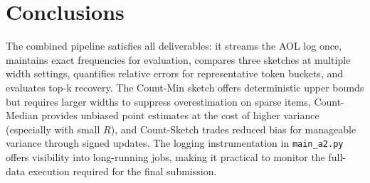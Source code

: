 \documentclass[11pt]{article}
\begin{document}
\section{Conclusions}
The combined pipeline satisfies all deliverables: it streams the AOL log once, maintains exact frequencies for evaluation, compares three sketches at multiple width settings, quantifies relative errors for representative token buckets, and evaluates top-k recovery. The Count-Min sketch offers deterministic upper bounds but requires larger widths to suppress overestimation on sparse items, Count-Median provides unbiased point estimates at the cost of higher variance (especially with small $R$), and Count-Sketch trades reduced bias for manageable variance through signed updates. The logging instrumentation in \texttt{main\_a2.py} offers visibility into long-running jobs, making it practical to monitor the full-data execution required for the final submission.
\end{document}
